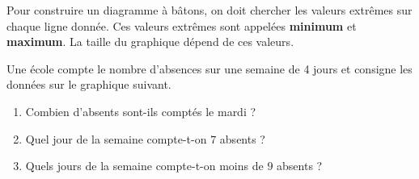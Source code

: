 \begin{pageCours}
\begin{Ex}
\begin{center}
\begin{tikzpicture}
\end{tikzpicture}
\end{center}
\end{Ex}

\begin{Mt} 

Pour construire un diagramme à bâtons, on doit chercher les valeurs  extrêmes sur chaque ligne donnée. Ces  valeurs  extrêmes sont appelées \textbf{minimum} et \textbf{maximum}. La taille du graphique dépend de ces valeurs.

\end{Mt}

\end{pageCours}

\begin{pageAD} 



Une école compte le nombre d'absences sur une semaine de 4 jours et consigne les données sur le graphique suivant.

\begin{minipage}{0.4\linewidth}


\end{minipage}
\begin{minipage}{0.6\linewidth}

\begin{enumerate}[leftmargin=*]
\item Combien d'absents sont-ils comptés le mardi ? 
\item Quel jour de la semaine compte-t-on $7$ absents ?  
\item Quels jours de la semaine compte-t-on moins de $9$ absents ?  
\end{enumerate}
\end{minipage}



\end{pageAD}
